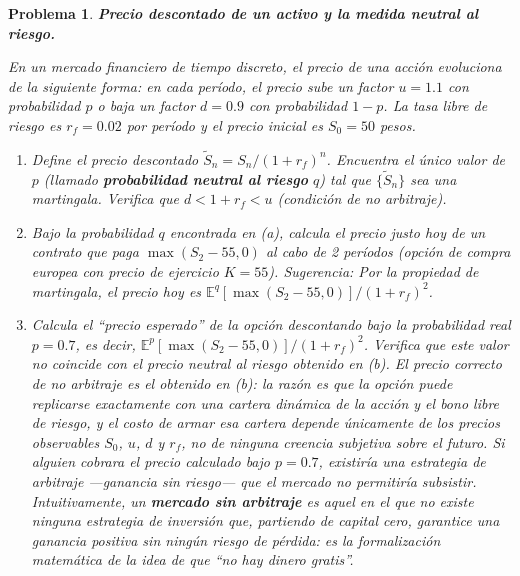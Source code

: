 \documentclass[12pt]{article}
\newtheorem{problem}{Problema}
\begin{document}
\begin{problem}
\textbf{Precio descontado de un activo y la medida neutral al riesgo.}

En un mercado financiero de tiempo discreto, el precio de una acción evoluciona de la siguiente forma: en cada período, el precio sube un factor $u = 1.1$ con probabilidad $p$ o baja un factor $d = 0.9$ con probabilidad $1-p$. La tasa libre de riesgo es $r_f = 0.02$ por período y el precio inicial es $S_0 = 50$ pesos.

\begin{enumerate}
    \item[(a)] Define el precio descontado $\tilde{S}_n = S_n / (1 + r_f)^n$. Encuentra el único valor de $p$ (llamado \textbf{probabilidad neutral al riesgo} $q$) tal que $\{\tilde{S}_n\}$ sea una martingala. Verifica que $d < 1 + r_f < u$ (condición de no arbitraje).

    \item[(b)] Bajo la probabilidad $q$ encontrada en (a), calcula el precio justo hoy de un contrato que paga $\max(S_2 - 55, 0)$ al cabo de 2 períodos (opción de compra europea con precio de ejercicio $K = 55$). \textit{Sugerencia:} Por la propiedad de martingala, el precio hoy es $\mathbb{E}^q[\max(S_2 - 55, 0)] / (1+r_f)^2$.

    \item[(c)] Calcula el ``precio esperado'' de la opción descontando bajo la probabilidad real $p = 0.7$, es decir, $\mathbb{E}^p[\max(S_2 - 55, 0)]/(1+r_f)^2$. Verifica que este valor \emph{no} coincide con el precio neutral al riesgo obtenido en (b). El precio correcto de no arbitraje es el obtenido en (b): la razón es que la opción puede replicarse exactamente con una cartera dinámica de la acción y el bono libre de riesgo, y el costo de armar esa cartera depende únicamente de los precios observables $S_0$, $u$, $d$ y $r_f$, no de ninguna creencia subjetiva sobre el futuro. Si alguien cobrara el precio calculado bajo $p = 0.7$, existiría una estrategia de arbitraje —ganancia sin riesgo— que el mercado no permitiría subsistir. Intuitivamente, un \textbf{mercado sin arbitraje} es aquel en el que no existe ninguna estrategia de inversión que, partiendo de capital cero, garantice una ganancia positiva sin ningún riesgo de pérdida: es la formalización matemática de la idea de que ``no hay dinero gratis''.
\end{enumerate}
\end{problem}
\end{document}
